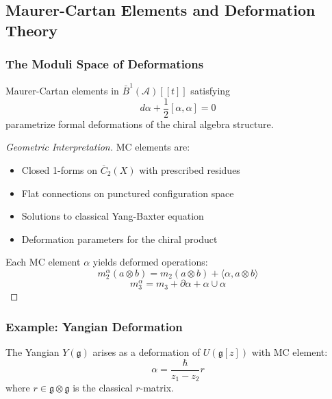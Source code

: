 
\subsection{Maurer-Cartan Elements and Deformation Theory}

\subsubsection{The Moduli Space of Deformations}

\begin{theorem}[Maurer-Cartan = Deformations]
Maurer-Cartan elements in $\bar{B}^1(\mathcal{A})[[t]]$ satisfying
$$d\alpha + \frac{1}{2}[\alpha, \alpha] = 0$$
parametrize formal deformations of the chiral algebra structure.
\end{theorem}

\begin{proof}[Geometric Interpretation]
MC elements are:
\begin{itemize}
\item Closed 1-forms on $\overline{C}_2(X)$ with prescribed residues
\item Flat connections on punctured configuration space
\item Solutions to classical Yang-Baxter equation
\item Deformation parameters for the chiral product
\end{itemize}

Each MC element $\alpha$ yields deformed operations:
$$m_2^\alpha(a \otimes b) = m_2(a \otimes b) + \langle \alpha, a \otimes b \rangle$$
$$m_3^\alpha = m_3 + \partial\alpha + \alpha \cup \alpha$$
\end{proof}

\subsubsection{Example: Yangian Deformation}

\begin{theorem}
The Yangian $Y(\mathfrak{g})$ arises as a deformation of $U(\mathfrak{g}[z])$ with MC element:
$$\alpha = \frac{\hbar}{z_1 - z_2} r$$
where $r \in \mathfrak{g} \otimes \mathfrak{g}$ is the classical $r$-matrix.
\end{theorem}

